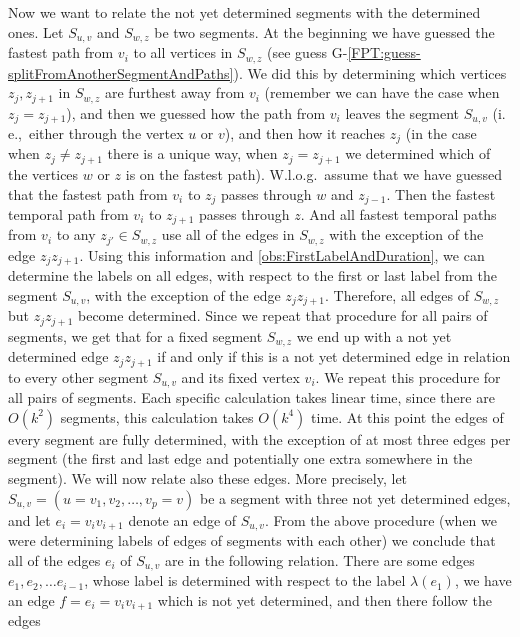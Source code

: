 \documentclass[a4paper,UKenglish,cleveref, autoref, thm-restate, anonymous]{lipics-v2021}
\newcommand{\ie}{i.\,e.,\ }
\begin{document}
Now we want to relate the not yet determined segments with the determined ones.
Let $S_{u,v}$ and $S_{w,z}$ be two segments.
At the beginning we have guessed the fastest path from $v_i$ to all vertices in $S_{w,z}$ (see guess G-\ref{FPT:guess-splitFromAnotherSegmentAndPaths}).
We did this by determining which vertices $z_j, z_{j+1}$ in $S_{w,z}$ are furthest away from $v_i$
(remember we can have the case when $z_j = z_{j+1}$),
and then we guessed how the path from $v_i$ leaves the segment $S_{u,v}$ (\ie either through the vertex $u$ or $v$),
and then how it reaches $z_j$ (in the case when $z_j \neq z_{j+1}$ there is a unique way,
when $z_j = z_{j+1}$ we determined which of the vertices $w$ or $z$ is on the fastest path).
W.l.o.g.\ assume that we have guessed that the fastest path from $v_i$ to $z_j$
passes through $w$ and $z_{j-1}$.
Then the fastest temporal path from $v_i$ to $z_{j+1}$ passes through $z$.
And all fastest temporal paths from $v_i$ to any $z_{j'} \in S_{w,z}$
use all of the edges in $S_{w,z}$ with the exception of the edge $z_j z_{j+1}$.
Using this information and \cref{obs:FirstLabelAndDuration}, we can determine the labels on all edges, with respect to the first or last label from the segment $S_{u,v}$,
with the exception of the edge $z_j z_{j+1}$.
Therefore, all edges of $S_{w,z}$ but $z_j z_{j+1}$ become determined.
Since we repeat that procedure for all pairs of segments,
we get that for a fixed segment $S_{w,z}$ we end up with a not yet determined edge $z_j z_{j+1}$
if and only if this is a not yet determined edge in relation to every other segment $S_{u,v}$ and its fixed vertex $v_i$.
%
We repeat this procedure for all pairs of segments.
Each specific calculation takes linear time, since there are $O(k^2)$ segments, this calculation takes $O(k^4)$ time.
At this point
the edges of every segment are fully determined, 
with the exception of at most three edges per segment (the first and last edge and potentially one extra somewhere in the segment).
We will now relate also these edges.
More precisely,
let $S_{u,v} = (u=v_1, v_2, \dots, v_p=v)$ be a segment with three not yet determined edges,
and let $e_i =v_iv_{i+1}$ denote an edge of $S_{u,v}$.
From the above procedure (when we were determining labels of edges of segments with each other) 
we conclude that all of the edges $e_i$ of $S_{u,v}$ are in the following relation.
There are some edges $e_1, e_2, \dots e_{i-1}$, whose label is determined with respect to the label $\lambda(e_1)$,
we have an edge $f = e_i = v_i v_{i+1}$ which is not yet determined,
and then there follow the edges
\end{document}
